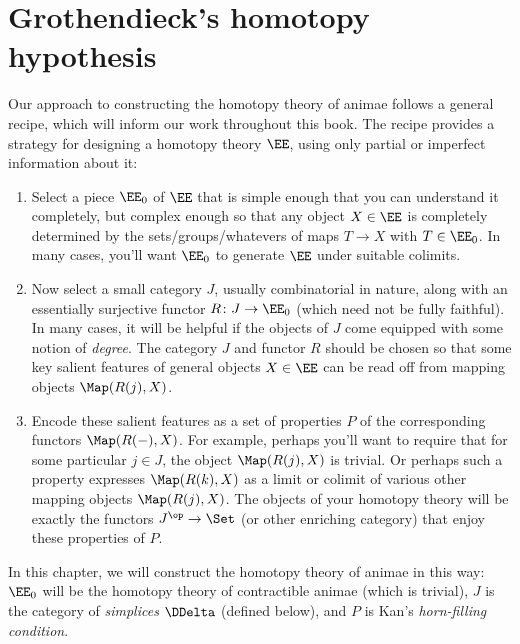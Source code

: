 
\chapter{Grothendieck's homotopy hypothesis}%
\label{cha:Grothendieckshomotopyhypothesis}

Our approach to constructing the homotopy theory of animae follows a general recipe, which will inform our work throughout this book.
The recipe provides a strategy for designing a homotopy theory $\EE$, using only partial or imperfect information about it:
\begin{enumerate}
  \item%
    Select a piece $\EE_0$ of $\EE$ that is simple enough that you can understand it completely,
    but complex enough so that any object $X \in \EE$ is completely determined by the sets/groups/whatevers of maps $T \to X$ with $T \in \EE_0$.
    In many cases, you'll want $\EE_0$ to generate $\EE$ under suitable colimits.
  \item%
    Now select a small category $J$, usually combinatorial in nature,
    along with an essentially surjective functor $R \colon J \to \EE_0$ (which need not be fully faithful).
    In many cases, it will be helpful if the objects of $J$ come equipped with some notion of \emph{degree}.
    The category $J$ and functor $R$ should be chosen so that some key salient features of general objects $X \in \EE$ can be read off from mapping objects $\Map(R(j),X)$.
  \item%
    Encode these salient features as a set of properties $P$ of the corresponding functors $\Map(R(-),X)$.
    For example, perhaps you'll want to require that for some particular $j \in J$, the object $\Map(R(j),X)$ is trivial.
    Or perhaps such a property expresses $\Map(R(k),X)$ as a limit or colimit of various other mapping objects $\Map(R(j),X)$.
    The objects of your homotopy theory will be exactly the functors $J^{\op} \to \Set$ (or other enriching category) that enjoy these properties of $P$.
\end{enumerate}

In this chapter, we will construct the homotopy theory of animae in this way:
$\EE_0$ will be the homotopy theory of contractible animae (which is trivial),
$J$ is the category of \emph{simplices} $\DDelta$ (defined below),
and $P$ is Kan's \emph{horn-filling condition}.

